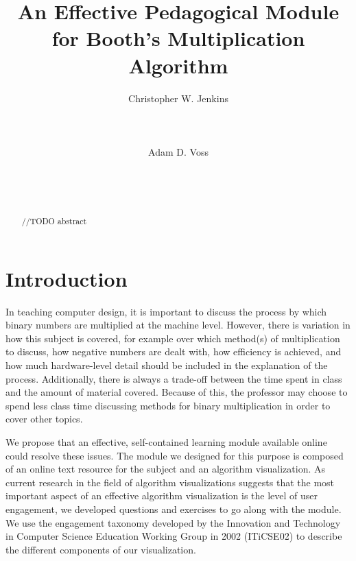 \documentclass{acm_proc_article-sp}
\begin{document}
\title{An Effective Pedagogical Module for Booth's Multiplication Algorithm}

\author{
    \alignauthor
    Christopher W.
Jenkins\\
       \\
       \\
       \\
    \alignauthor
    Adam D.
Voss\\
       \\
       \\
       \\
}

\maketitle

\begin{abstract}
//TODO abstract
\end{abstract}

\section{Introduction}
In teaching computer design, it is important to discuss the process by which binary numbers are multiplied at the machine level.
However, there is variation in how this subject is covered, for example over which method(s) of multiplication to discuss, how negative numbers are dealt with, how efficiency is achieved, and how much hardware-level detail should be included in the explanation of the process.
Additionally, there is always a trade-off between the time spent in class and the amount of material covered.
Because of this, the professor may choose to spend less class time discussing methods for binary multiplication in order to cover other topics.

We propose that an effective, self-contained learning module available online could resolve these issues.
The module we designed for this purpose is composed of an online text resource for the subject and an algorithm visualization.
As current research in the field of algorithm visualizations suggests that the most important aspect of an effective algorithm visualization is the level of user engagement\cite{tnaps:visengage}, we developed questions and exercises to go along with the module.
We use the engagement taxonomy developed by the Innovation and Technology in Computer Science Education Working Group in 2002 (ITiCSE02) to describe the different components of our visualization.
\end{document}
